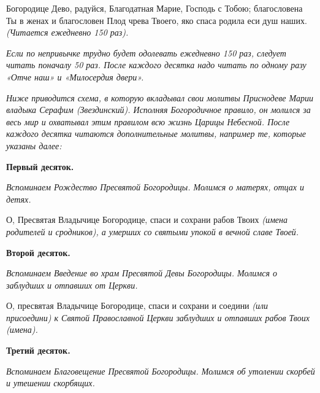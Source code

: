 

\label{_content_pered-ikonami-Presvyatoy-Bogorodici}

 

 

Богородице Дево, радуйся, Благодатная Марие, Господь с Тобою; благословена Ты в женах и благословен Плод чрева Твоего, яко спаса родила еси душ наших. \itshape (Читается ежедневно 150 раз).

\normalfont{}


\itshape Если по непривычке трудно будет одолевать ежедневно 150 раз, следует читать поначалу 50 раз. После каждого десятка надо читать по одному разу «Отче наш» и «Милосердия двери».\normalfont{}


\itshape Ниже приводится схема, в которую вкладывал свои молитвы Приснодеве Марии владыка Серафим (Звездинский). Исполняя Богородичное правило, он молился за весь мир и охватывал этим правилом всю жизнь Царицы Небесной. После каждого десятка читаются дополнительные молитвы, например те, которые указаны далее:\normalfont{}


\medskip


\bfseries Первый десяток.\normalfont{}\nopagebreak


\itshape Вспоминаем Рождество Пресвятой Богородицы. Молимся о матерях, отцах и детях.

\normalfont{}О, Пресвятая Владычице Богородице, спаси и сохрани рабов Твоих \itshape (имена родителей и сродников)\normalfont{}, а умерших со святыми упокой в вечной славе Твоей.


\medskip


\bfseries Второй десяток.\normalfont{}\nopagebreak


\itshape Вспоминаем Введение во храм Пресвятой Девы Богородицы. Молимся о заблудших и отпавших от Церкви\normalfont{}.

О, пресвятая Владычице Богородице, спаси и сохрани и соедини \itshape (или присоедини)\normalfont{} к Святой Православной Церкви заблудших и отпавших рабов Твоих \itshape (имена).\normalfont{}


\medskip


\bfseries Третий десяток.\normalfont{}\nopagebreak


\itshape Вспоминаем Благовещение Пресвятой Богородицы. Молимся об утолении скорбей и утешении скорбящих.

